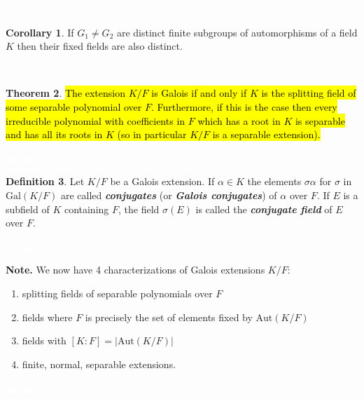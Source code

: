 \documentclass{article}
\theoremstyle{definition}
\newtheorem{thm}{Theorem}[section]
\newtheorem{cor}[thm]{Corollary}
\newtheorem{defn}[thm]{Definition}
\newcommand{\nl}{\textcolor{white}{nothing}}
\newcommand{\al}{\alpha}
\newcommand{\sig}{\sigma}
\newcommand{\Aut}{\text{Aut}}
\newcommand{\Gal}{\text{Gal}}
\begin{document}
\nl

\begin{cor}
If $G_1\neq G_2$ are distinct finite subgroups of automorphisms of a field $K$ then their fixed fields are also distinct.
\end{cor}

\nl

\begin{thm}
\hl{The extension $K/F$ is Galois if and only if $K$ is the splitting field of some separable polynomial over $F$. Furthermore, if this is the case then every irreducible polynomial with coefficients in $F$ which has a root in $K$ is separable and has all its roots in $K$ (so in particular $K/F$ is a separable extension).}
\end{thm}

\nl

\begin{defn}
Let $K/F$ be a Galois extension. If $\al\in K$ the elements $\sig \al$ for $\sig$ in $\Gal(K/F)$ are called \textit{\textbf{conjugates}} (or \textit{\textbf{Galois conjugates}}) of $\al$ over $F$. If $E$ is a subfield of $K$ containing $F$, the field $\sig(E)$ is called the \textit{\textbf{conjugate field}} of $E$ over $F$.
\end{defn}

\nl

\textbf{Note.} We now have 4 characterizations of Galois extensions $K/F$:
\begin{enumerate}
\item splitting fields of separable polynomials over $F$
\item fields where $F$ is precisely the set of elements fixed by $\Aut(K/F)$
\item fields with $[K:F] = |\Aut(K/F)|$
\item finite, normal, separable extensions.
\end{enumerate}

\nl
\end{document}

